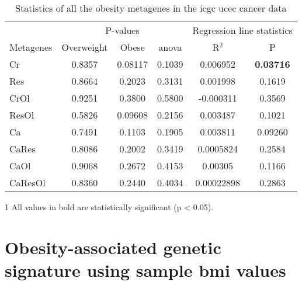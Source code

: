 \begin{appendices}
\begin{table}[htpb]
	\centering
	\caption[Statistics of all the obesity metagenes in the \gls{icgc} \acrshort{ucec} cancer data]{Statistics of all the obesity metagenes in the \gls{icgc} \gls{ucec} cancer data}
	\label{tab:degmetaucec}
	\begin{threeparttable}
		\begin{tabular}{lccccc}
			& \multicolumn{3}{c}{ P-values} & \multicolumn{2}{c}{ Regression line statistics}\\
			\cmidrule(r){2-4} \cmidrule(r){5-6}
			Metagenes &  Overweight &  Obese &  \gls{anova} &  R$^2$ &  P \\
			\hline
			\hline
			\rule{0pt}{2.25ex}Cr      & 0.8357                      & 0.08117 & 0.1039             & 0.006952   & {\bfseries 0.03716}\tnote{1}\\
			Res     & 0.8664                      & 0.2023  & 0.3131             & 0.001998   & 0.1619              \\
			CrOl    & 0.9251                      & 0.3800  & 0.5800             & -0.000311  & 0.3569              \\
			ResOl   & 0.5826                      & 0.09608 & 0.2156             & 0.003487   & 0.1021              \\
			Ca      & 0.7491                      & 0.1103  & 0.1905             & 0.003811   & 0.09260             \\
			CaRes   & 0.8086                      & 0.2002  & 0.3419             & 0.0005824  & 0.2584              \\
			CaOl    & 0.9068                      & 0.2672  & 0.4153             & 0.00305    & 0.1166              \\
			CaResOl & 0.8360                      & 0.2440  & 0.4034             & 0.00022898 & 0.2863              \\
			\hline
			\hline
		\end{tabular}
		\begin{tablenotes}
			\begin{footnotesize}
				\item [1] All values in bold are statistically significant (p \textless{} 0.05).
			\end{footnotesize}
		\end{tablenotes}
	\end{threeparttable}
\end{table}

	\section{Obesity-associated genetic signature using sample \gls{bmi} values}
	\label{sec:obesity_associated_genetic_signature_using_sample_bmi_values}


\end{appendices}
